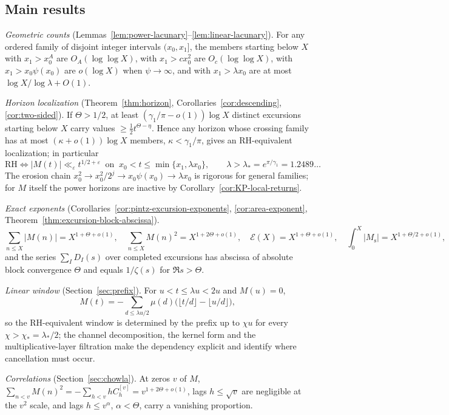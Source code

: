\documentclass[11pt]{amsart}
\numberwithin{equation}{section}
\theoremstyle{plain}
\theoremstyle{definition}
\theoremstyle{remark}
\newcommand{\Ms}{M_{\mathrm{s}}}
\newcommand{\eps}{\varepsilon}
\newcommand{\En}{\mathcal{E}}
\begin{document}
\subsection{Main results}
\emph{Geometric counts} (Lemmas~\ref{lem:power-lacunary}--\ref{lem:linear-lacunary}).
For any ordered family of disjoint integer intervals $(x_0,x_1]$, the members
starting below $X$ with $x_1>x_0^A$ are $O_A(\log\log X)$, with $x_1>cx_0^2$
are $O_c(\log\log X)$, with $x_1>x_0\psi(x_0)$ are $o(\log X)$ when
$\psi\to\infty$, and with $x_1>\lambda x_0$ are at most
$\log X/\log\lambda+O(1)$.

\emph{Horizon localization} (Theorem~\ref{thm:horizon},
Corollaries~\ref{cor:descending}, \ref{cor:two-sided}). If $\Theta>1/2$, at
least $(\gamma_1/\pi-o(1))\log X$ distinct excursions starting below $X$
carry values $\ge\frac12t^{\Theta-\eta}$. Hence any horizon whose crossing
family has at most $(\kappa+o(1))\log X$ members, $\kappa<\gamma_1/\pi$, gives
an RH-equivalent localization; in particular
\[
\mathrm{RH}\iff |M(t)|\ll_\eps t^{1/2+\eps}\ \text{ on }\
x_0<t\le\min\{x_1,\lambda x_0\},\qquad \lambda>\lambda_*=e^{\pi/\gamma_1}=1.2489\ldots
\]
The erosion chain $x_0^2\to x_0^2/2^j\to x_0\psi(x_0)\to\lambda x_0$ is
rigorous for general families; for $M$ itself the power horizons are
inactive by Corollary~\ref{cor:KP-local-returns}.

\emph{Exact exponents} (Corollaries~\ref{cor:pintz-excursion-exponents},
\ref{cor:area-exponent}, Theorem~\ref{thm:excursion-block-abscissa}).
\[
\sum_{n\le X}|M(n)|=X^{1+\Theta+o(1)},\quad \sum_{n\le X}M(n)^2=X^{1+2\Theta+o(1)},\quad
\En(X)=X^{1+\Theta+o(1)},\quad \int_0^X|\Ms|=X^{1+\Theta/2+o(1)},
\]
and the series $\sum_I D_I(s)$ over completed excursions has abscissa of
absolute block convergence $\Theta$ and equals $1/\zeta(s)$ for
$\Re s>\Theta$.

\emph{Linear window} (Section~\ref{sec:prefix}). For $u<t\le\lambda u<2u$ and
$M(u)=0$,
\[
M(t)=-\sum_{d\le\lambda u/2}\mu(d)\bigl(\lfloor t/d\rfloor-\lfloor u/d\rfloor\bigr),
\]
so the RH-equivalent window is determined by the prefix up to $\chi u$ for
every $\chi>\chi_*=\lambda_*/2$; the channel decomposition, the kernel form
and the multiplicative-layer filtration make the dependency explicit and
identify where cancellation must occur.

\emph{Correlations} (Section~\ref{sec:chowla}). At zeros $v$ of $M$,
$\sum_{n<v}M(n)^2=-\sum_{h<v}hC_h^{[v]}=v^{1+2\Theta+o(1)}$, lags
$h\le\sqrt v$ are negligible at the $v^2$ scale, and lags $h\le v^\alpha$,
$\alpha<\Theta$, carry a vanishing proportion.
\end{document}
